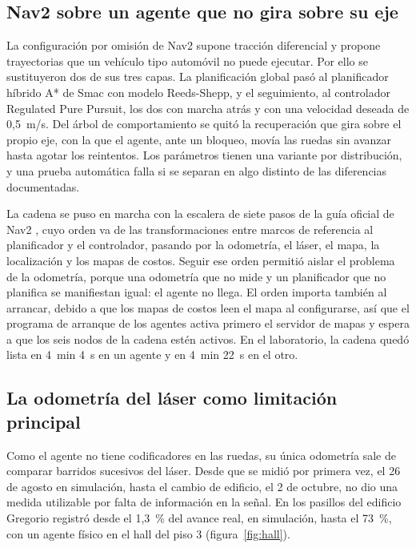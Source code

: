 \subsection{Nav2 sobre un agente que no gira sobre su eje}
\label{sec:nav2-ackermann}

La configuración por omisión de Nav2 supone tracción diferencial y propone trayectorias que un vehículo tipo automóvil no puede ejecutar. Por ello se sustituyeron dos de
sus tres capas. La planificación global pasó al planificador híbrido A* de Smac con modelo Reeds-Shepp, y el seguimiento, al controlador Regulated Pure Pursuit, los dos con
marcha atrás y con una velocidad deseada de 0,5~m/s. Del árbol de comportamiento se quitó la recuperación que gira sobre el propio eje, con la que el agente, ante un bloqueo,
movía las ruedas sin avanzar hasta agotar los reintentos. Los parámetros tienen una variante por distribución, y una prueba automática falla si se separan en algo distinto de
las diferencias documentadas.

La cadena se puso en marcha con la escalera de siete pasos de la guía oficial de Nav2 \autocite{nav2setup}, cuyo orden va de las transformaciones entre marcos de referencia al
planificador y el controlador, pasando por la odometría, el láser, el mapa, la localización y los mapas de costos. Seguir ese orden permitió aislar el problema de la odometría,
porque una odometría que no mide y un planificador que no planifica se manifiestan igual: el agente no llega. El orden importa también al arrancar, debido a que los mapas de
costos leen el mapa al configurarse, así que el programa de arranque de los agentes activa primero el servidor de mapas y espera a que los seis nodos de la cadena estén
activos. En el laboratorio, la cadena quedó lista en 4~min 4~s en un agente y en 4~min 22~s en el otro.

\subsection{La odometría del láser como limitación principal}
\label{sec:odometria-laser}

Como el agente no tiene codificadores en las ruedas, su única odometría sale de comparar barridos sucesivos del láser. Desde que se midió por primera vez, el 26 de agosto en
simulación, hasta el cambio de edificio, el 2 de octubre, no dio una medida utilizable por falta de información en la señal. En los pasillos del edificio Gregorio registró desde el
1,3~\% del avance real, en simulación, hasta el 73~\%, con un agente físico en el hall del piso 3 (figura~\ref{fig:hall}).

